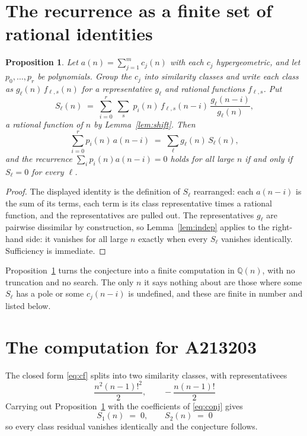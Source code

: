 \documentclass[11pt,a4paper]{article}
\theoremstyle{plain}
\newtheorem{proposition}[theorem]{Proposition}
\theoremstyle{definition}
\begin{document}
\section{The recurrence as a finite set of rational identities}

\begin{proposition}\label{prop:main}
Let $a(n)=\sum_{j=1}^{m}c_{j}(n)$ with each $c_{j}$ hypergeometric, and let
$p_{0},\dots,p_{r}$ be polynomials. Group the $c_{j}$ into similarity classes and write
each class as $g_{\ell}(n)\,f_{\ell,s}(n)$ for a representative $g_{\ell}$ and rational
functions $f_{\ell,s}$. Put
\[
S_{\ell}(n)\;=\;\sum_{i=0}^{r}\;\sum_{s}\;p_{i}(n)\,f_{\ell,s}(n-i)\,
\frac{g_{\ell}(n-i)}{g_{\ell}(n)} ,
\]
a rational function of $n$ by Lemma~\ref{lem:shift}. Then
\[
\sum_{i=0}^{r}p_{i}(n)\,a(n-i)\;=\;\sum_{\ell}g_{\ell}(n)\,S_{\ell}(n),
\]
and the recurrence $\sum_{i}p_{i}(n)a(n-i)=0$ holds for all large $n$ if and only if
$S_{\ell}=0$ for every $\ell$.
\end{proposition}

\begin{proof}
The displayed identity is the definition of $S_{\ell}$ rearranged: each $a(n-i)$ is the
sum of its terms, each term is its class representative times a rational function, and the
representatives are pulled out. The representatives $g_{\ell}$ are pairwise dissimilar by
construction, so Lemma~\ref{lem:indep} applies to the right-hand side: it vanishes for all
large $n$ exactly when every $S_{\ell}$ vanishes identically. Sufficiency is immediate.
\end{proof}

Proposition~\ref{prop:main} turns the conjecture into a finite computation in
$\mathbb{Q}(n)$, with no truncation and no search. The only $n$ it says nothing about are
those where some $S_{\ell}$ has a pole or some $c_{j}(n-i)$ is undefined, and these are
finite in number and listed below.

\section{The computation for A213203}

The closed form \eqref{eq:cf} splits into two similarity classes, with
representativees
\[
\frac{n^{2} \left(n - 1\right)!^{2}}{2},\qquad - \frac{n \left(n - 1\right)!}{2}
\]
Carrying out Proposition~\ref{prop:main} with the coefficients of \eqref{eq:conj} gives
\[
S_{1}(n)\;=\;0,\qquad S_{2}(n)\;=\;0
\]
so every class residual vanishes identically and the conjecture follows.
\end{document}
